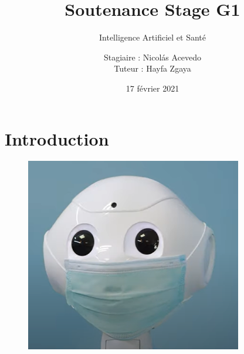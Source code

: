 \documentclass{cubeamer}
\title{Soutenance Stage G1}
\subtitle{Intelligence Artificiel et Santé}
\author[Nicolás Acevedo]{Stagiaire : Nicolás Acevedo \\ Tuteur : Hayfa Zgaya}
\date{17 février 2021} %
\institute[École Centrale de Lille]{}
\begin{document}
	
\maketitle


\section{Introduction}

\begin{frame}
	\begin{figure}
		\includegraphics[height = 0.7\textheight]{img/peppermask.png}
	\end{figure}
\end{frame}
\end{document}
